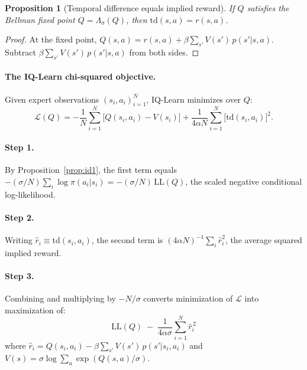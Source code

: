 \documentclass[10pt]{article}
\newtheorem{proposition}{Proposition}
\begin{document}
\begin{proposition}[Temporal difference equals implied reward]
\label{prop:id2}
If $Q$ satisfies the Bellman fixed point $Q = \Lambda_\sigma(Q)$, then $\mathrm{td}(s,a) = r(s,a)$.
\end{proposition}

\begin{proof}
At the fixed point, $Q(s,a) = r(s,a) + \beta \sum_{s'} V(s')\,p(s'|s,a)$. Subtract $\beta \sum_{s'} V(s')\,p(s'|s,a)$ from both sides.
\end{proof}

\paragraph{The IQ-Learn chi-squared objective.} Given expert observations $(s_i, a_i)_{i=1}^N$, IQ-Learn minimizes over $Q$:
\begin{equation}
\mathcal{L}(Q) = -\frac{1}{N}\sum_{i=1}^{N}\bigl[Q(s_i,a_i) - V(s_i)\bigr] + \frac{1}{4\alpha N}\sum_{i=1}^{N}\bigl[\mathrm{td}(s_i,a_i)\bigr]^2.
\label{eq:iqlearn}
\end{equation}

\paragraph{Step 1.} By Proposition~\ref{prop:id1}, the first term equals $-(\sigma/N)\sum_i \log\pi(a_i|s_i) = -(\sigma/N)\,\mathrm{LL}(Q)$, the scaled negative conditional log-likelihood.

\paragraph{Step 2.} Writing $\hat{r}_i \equiv \mathrm{td}(s_i,a_i)$, the second term is $(4\alpha N)^{-1}\sum_i \hat{r}_i^2$, the average squared implied reward.

\paragraph{Step 3.} Combining and multiplying by $-N/\sigma$ converts minimization of $\mathcal{L}$ into maximization of:
\begin{equation}
\boxed{\;\mathrm{LL}(Q) \;-\; \frac{1}{4\alpha\sigma}\sum_{i=1}^{N} \hat{r}_i^{\,2}\;}
\label{eq:penMLE}
\end{equation}
where $\hat{r}_i = Q(s_i,a_i) - \beta\sum_{s'} V(s')\,p(s'|s_i,a_i)$ and $V(s) = \sigma\log\sum_a\exp(Q(s,a)/\sigma)$.
\end{document}
